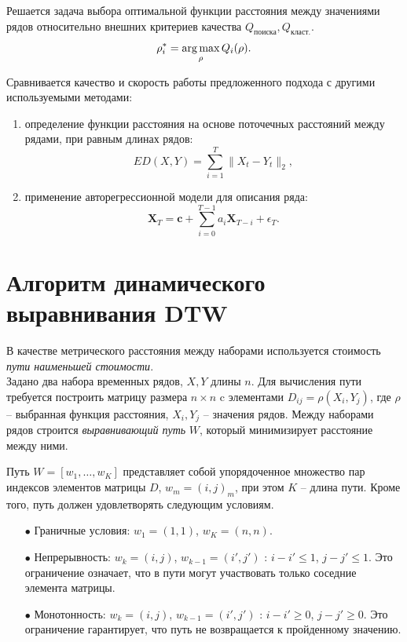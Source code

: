 \documentclass[12pt,twoside]{article}
\begin{document}
        Решается задача выбора оптимальной функции расстояния  между значениями рядов относительно внешних критериев качества $Q_\text{поиска}, Q_\text{класт.}$.
        $$
            \rho_i^* = \argmax_\rho Q_i(\rho).
        $$
    
        
        Сравнивается качество и скорость работы предложенного подхода с другими используемыми методами:
        \begin{enumerate}[label=\arabic*)]
            \item определение функции расстояния на основе поточечных расстояний между рядами, при равным длинах рядов:
                $$
                    ED(X, Y) = \sum\limits_{i=1}^T \|X_t - Y_t\|_2,
                $$

            \item применение авторегрессионной модели для описания ряда:
            $$
                \mathbf{X}_T =  \mathbf{c} + \sum\limits_{i=0}^{T - 1} a_i\mathbf{X}_{T-i} + \epsilon_T.
            $$
        \end{enumerate}
    
    \label{sec:dtw}\section{Алгоритм динамического выравнивания DTW}

        В качестве метрического расстояния между наборами используется стоимость \textit{пути наименьшей стоимости}. \\
        Задано два набора временных рядов, $X, Y$ длины $n$.
        Для вычисления пути требуется построить матрицу размера $n\times n$ c элементами $D_{ij}=\rho(X_i, Y_j)$, где $\rho$ \--- выбранная функция расстояния, $X_i, Y_j$ \--- значения рядов. Между наборами рядов строится \textit{выравнивающий путь} $W$, который минимизирует расстояние между ними.
        
        \begin{Def}{}
             Путь $W = [w_1,\dots, w_K]$ представляет собой упорядоченное множество пар индексов элементов матрицы $D$, $w_m = (i, j)_m$, при этом $K$ \--- длина пути. Кроме того, путь должен удовлетворять следующим условиям.
                \begin{itemize}
                    \item[$\bullet$] Граничные условия: $w_1=(1,1)$, $w_K=(n, n)$.
                    \item[$\bullet$] Непрерывность: $w_k = (i, j)$, $w_{k-1}=(i', j')$ : $i-i' \leq 1$, $j-j' \leq 1$. Это ограничение означает, что в пути могут участвовать только соседние элемента матрицы.
                    \item[$\bullet$] Монотонность: $w_k = (i, j)$, $w_{k-1}=(i', j')$ : $i-i' \geq 0$, $j-j'\geq 0$. Это ограничение гарантирует, что путь не возвращается к пройденному значению.
                \end{itemize}
        \end{Def}
        
\end{document}

